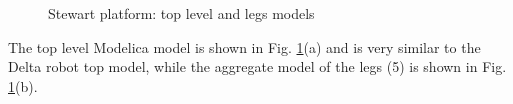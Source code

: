 \documentclass[]{interact}
\theoremstyle{plain}%
\theoremstyle{definition}
\theoremstyle{remark}
\begin{document}
\begin{figure}
\centering
{}
\caption{Stewart platform: top level and legs models} \label{Fig:Stewart_platform_Modelica_top_level}
\end{figure}
The top level Modelica model is shown in Fig. \ref{Fig:Stewart_platform_Modelica_top_level}(a) and is very similar to the Delta robot top model, while the aggregate model of the legs (5) is shown in Fig. \ref{Fig:Stewart_platform_Modelica_top_level}(b).
\end{document}
